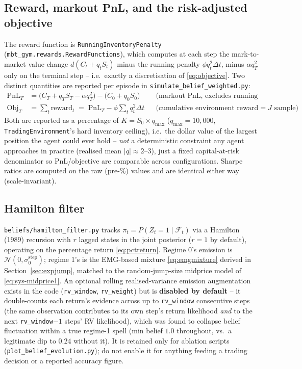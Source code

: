\documentclass[11pt]{article}
\newcommand{\N}{\mathcal{N}}
\begin{document}
\subsection{Reward, markout PnL, and the risk-adjusted objective}
The reward function is \texttt{RunningInventoryPenalty} (\texttt{mbt\_gym.rewards.RewardFunctions}), which computes at each step the mark-to-market value change $d(C_t + q_tS_t)$ minus the running penalty $\phi q_t^2\Delta t$, minus $\alpha q_T^2$ only on the terminal step -- i.e.\ exactly a discretisation of \eqref{eq:objective}. Two distinct quantities are reported per episode in \texttt{simulate\_belief\_weighted.py}:
\begin{align}
\mathrm{PnL}_T &= \big(C_T + q_TS_T - \alpha q_T^2\big) - \big(C_0+q_0S_0\big) &&\text{(markout PnL, excludes running penalty)}\label{eq:sys-pnl}\\
\mathrm{Obj}_T &= \sum\nolimits_t \text{reward}_t \;=\; \mathrm{PnL}_T - \phi\!\sum\nolimits_t q_t^2\Delta t &&\text{(cumulative environment reward} = J\text{ sample)}\label{eq:sys-obj}
\end{align}
Both are reported as a percentage of $K = S_0 \times q_{\max}$ ($q_{\max}=10{,}000$, \texttt{TradingEnvironment}'s hard inventory ceiling), i.e.\ the dollar value of the largest position the agent could ever hold -- \emph{not} a deterministic constraint any agent approaches in practice (realised mean $|q|\approx2$--$3$), just a fixed capital-at-risk denominator so PnL/objective are comparable across configurations. Sharpe ratios are computed on the raw (pre-\%) values and are identical either way (scale-invariant).

\subsection{Hamilton filter}
\texttt{beliefs/hamilton\_filter.py} tracks $\pi_t = P(Z_t=1\mid\mathcal{F}_t)$ via a Hamilton (1989) recursion with $r$ lagged states in the joint posterior ($r=1$ by default), operating on the percentage return \eqref{eq:pctreturn}. Regime 0's emission is $\N(0,\sigma_0^{\text{step}})$; regime 1's is the EMG-based mixture \eqref{eq:emgmixture} derived in Section~\ref{sec:expjump}, matched to the random-jump-size midprice model of \eqref{eq:sys-midprice1}. An optional rolling realised-variance emission augmentation exists in the code (\texttt{rv\_window}, \texttt{rv\_weight}) but is \textbf{disabled by default} -- it double-counts each return's evidence across up to \texttt{rv\_window} consecutive steps (the same observation contributes to its own step's return likelihood \emph{and} to the next \texttt{rv\_window}$-1$ steps' RV likelihood), which was found to collapse belief fluctuation within a true regime-1 spell (min belief $1.0$ throughout, vs.\ a legitimate dip to $0.24$ without it). It is retained only for ablation scripts (\texttt{plot\_belief\_evolution.py}); do not enable it for anything feeding a trading decision or a reported accuracy figure.
\end{document}
